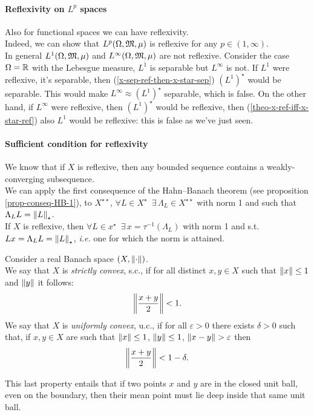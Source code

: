 \paragraph{Reflexivity on $L^p$ spaces} Also for functional spaces we can have reflexivity.\\
Indeed, we can show that $L^p(\Omega, \mathfrak M, \mu)$ is reflexive for any $p \in (1,\infty)$.\\
In general $L^1(\Omega, \mathfrak M, \mu)$ and $L^\infty(\Omega, \mathfrak M, \mu)$ are not reflexive. Consider the case $\Omega=\mathbb R$ with the Lebesgue measure, $L^1$ is separable but $L^\infty$ is not. If $L^1$ were reflexive, it's separable, then (\vref{x-sep-ref-then-x-star-sep}) $(L^1)^\star$ would be separable. This would make $L^\infty \approx (L^1)^\star$ separable, which is false. On the other hand, if $L^\infty$ were reflexive, then $(L^1)^\star$ would be reflexive, then (\vref{theo-x-ref-iff-x-star-ref}) also $L^1$ would be reflexive: this is false as we've just seen.

\paragraph{Sufficient condition for reflexivity} We know that if $X$ is reflexive, then any bounded sequence contains a weakly-converging subsequence.\\
We can apply the first consequence of the Hahn--Banach theorem (see proposition \vref{prop-conseq-HB-1}),
to $X^{\star\star}$, $\forall L \in X^\star \enspace \exists \, \Lambda_L \in X^{\star\star}$
with norm 1 and such that $\Lambda_L L = \left\lVert L\right\rVert_{\star}$.\\
If $X$ is reflexive, then $\forall L \in x^\star \enspace \exists \, x = \tau^{-1} (\Lambda_L)$ with
norm 1 and s.t. $Lx = \Lambda_L L = \left\lVert L\right\rVert_{\star}$, \textit{i.e.} one for which the norm is attained.

\begin{defn}
	Consider a real Banach space $(X, \left\lVert\cdot\right\rVert)$.\\
	We say that $X$ is \emph{strictly convex}, s.c., if for all distinct $x,y \in X$ such that $\left\lVert x\right\rVert\leq 1$ and $\left\lVert y\right\rVert$ it follows: 
	$$
		\left\lVert\frac{x+y}{2}\right\rVert 
		< 1
		.
	$$
	We say that $X$ is \emph{uniformly convex}, u.c., if for all $\varepsilon > 0$ there exists $\delta > 0$ such that, if $x, y \in X$ are such that $\left\lVert x\right\rVert \leq 1$, $\left\lVert y\right\rVert \leq 1$, $\left\lVert x-y\right\rVert > \varepsilon$ then 
	$$
		\left\lVert\frac{x+y}{2}\right\rVert
		< 1 - \delta
		.
	$$
\end{defn}
This last property entails that if two points $x$ and $y$ are in the closed unit ball, even on the boundary, then their mean point must lie deep inside that same unit ball.

